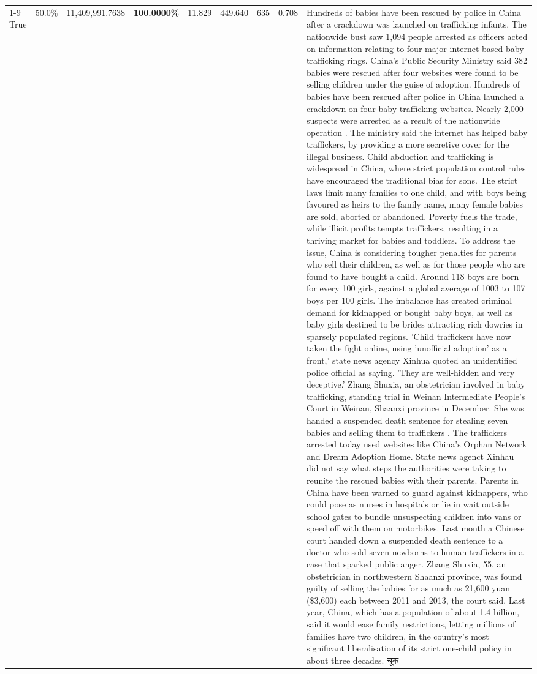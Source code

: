\begin{table}[H]
\begin{tabular}{lllrlllll}
\cline{1-9}
True & 50.0\% & 11,409,991.7638 & \bfseries \color{red} 100.0000\% & 11.829 & 449.640 & 635 & 0.708 & Hundreds of babies have been rescued by police in China after a crackdown was launched on trafficking infants. The nationwide bust saw 1,094 people arrested as officers acted on information relating to four major internet-based baby trafficking rings. China's Public Security Ministry said 382 babies were rescued after four websites were found to be selling children under the guise of adoption. Hundreds of babies have been rescued after police in China launched a crackdown on four baby trafficking websites. Nearly 2,000 suspects were arrested as a result of the nationwide operation . The ministry said the internet has helped baby traffickers, by providing a more secretive cover for the illegal business. Child abduction and trafficking is widespread in China, where strict population control rules have encouraged the traditional bias for sons. The strict laws limit many families to one child, and with boys being favoured as heirs to the family name, many female babies are sold, aborted or abandoned. Poverty fuels the trade, while illicit profits tempts traffickers, resulting in a thriving market for babies and toddlers. To address the issue, China is considering tougher penalties for parents who sell their children, as well as for those people who are found to have bought a child. Around 118 boys are born for every 100 girls, against a global average of 1003 to 107 boys per 100 girls. The imbalance has created criminal demand for kidnapped or bought baby boys, as well as baby girls destined to be brides attracting rich dowries in sparsely populated regions. 'Child traffickers have now taken the fight online, using 'unofficial adoption' as a front,' state news agency Xinhua quoted an unidentified police official as saying. 'They are well-hidden and very deceptive.' Zhang Shuxia, an obstetrician involved in baby trafficking, standing trial in Weinan Intermediate People's Court in Weinan, Shaanxi province in December. She was handed a suspended death sentence for stealing seven babies and selling them to traffickers . The traffickers arrested today used websites like China's Orphan Network and Dream Adoption Home. State news agenct Xinhau did not say what steps the authorities were taking to reunite the rescued babies with their parents. Parents in China have been warned to guard against kidnappers, who could pose as nurses in hospitals or lie in wait outside school gates to bundle unsuspecting children into vans or speed off with them on motorbikes. Last month a Chinese court handed down a suspended death sentence to a doctor who sold seven newborns to human traffickers in a case that sparked public anger. Zhang Shuxia, 55, an obstetrician in northwestern Shaanxi province, was found guilty of selling the babies for as much as 21,600 yuan (\$3,600) each between 2011 and 2013, the court said. Last year, China, which has a population of about 1.4 billion, said it would ease family restrictions, letting millions of families have two children, in the country's most significant liberalisation of its strict one-child policy in about three decades. चूक \\

\end{tabular}
\end{table}
